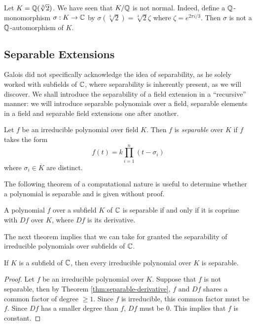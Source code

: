 \begin{example}
	Let $K = \mathbb Q(\sqrt[3]{2})$. We have seen that $K / \mathbb Q$ is not normal. Indeed, define a $\mathbb Q$-monomorphism $\sigma : K \to \mathbb C$ by $\sigma(\sqrt[3]{2}) =  \sqrt[3]{2}\zeta $ where $\zeta = e^{2 \pi i / 3}$. Then $\sigma$ is not a $\mathbb Q$-automorphism of $K$. 
\end{example}


\subsection{Separable Extensions}

Galois did not specifically acknowledge the idea of separability, as he solely worked with subfields of $\mathbb C$, where separability is inherently present, as we will discover. We shall introduce the separability of a field extension in a ``recursive'' manner: we will introduce separable polynomials over a field, separable elements in a field and separable field extensions one after another. 

\begin{definition}
    Let $f$ be an irreducible polynomial over field $K$. Then $f$ is \textit{separable} over $K$ if $f$ takes the form 
    $$
        f(t) = k \prod_{i = 1} ^ n(t - \sigma_i)
    $$
    where $\sigma_i \in \overline K$ are distinct.
\end{definition}

The following theorem of a computational nature is useful to determine whether a polynomial is separable and is given without proof. 

\begin{theorem} \label{thm:separable-derivative}
    A polynomial $f$ over a subfield $K$ of $\mathbb C$ is separable if and only if it is coprime with $Df$ over $K$, where $Df$ is its derivative. 
\end{theorem}

The next theorem implies that we can take for granted the separability of irreducible polynomials over subfields of $\mathbb C$. 

\begin{theorem} \label{thm:separable-poly-in-C}
    If $K$ is a subfield of $\mathbb C$, then every irreducible polynomial over $K$ is separable. 
\end{theorem}

\begin{proof}
    Let $f$ be an irreducible polynomial over $K$. Suppose that $f$ is not separable, then by Theorem \ref{thm:separable-derivative}, $f$ and $Df$ shares a common factor of degree $\ge 1$. Since $f$ is irreducible, this common factor must be $f$. Since $Df$ has a smaller degree than $f$, $Df$ must be $0$. This implies that $f$ is constant.
\end{proof}

